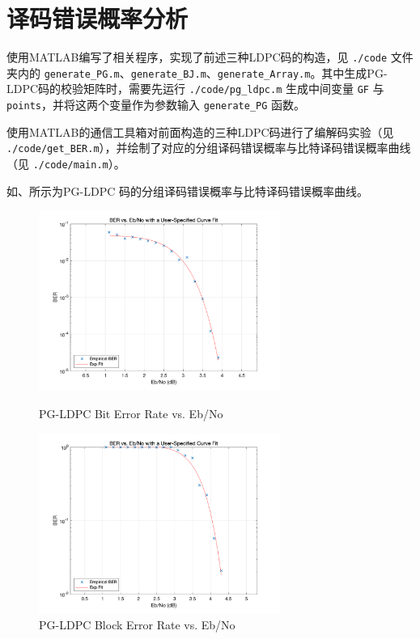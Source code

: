 \documentclass[lang=cn,11pt,a4paper,numbers]{elegantpaper}
\begin{document}
\section{译码错误概率分析}

使用MATLAB编写了相关程序，实现了前述三种LDPC码的构造，见 \lstinline{./code} 文件夹内的 \lstinline{generate_PG.m}、\lstinline{generate_BJ.m}、\lstinline{generate_Array.m}。其中生成PG-LDPC码的校验矩阵时，需要先运行 \lstinline{./code/pg_ldpc.m} 生成中间变量 \lstinline{GF} 与 \lstinline{points}，并将这两个变量作为参数输入 \lstinline{generate_PG} 函数。

使用MATLAB的通信工具箱对前面构造的三种LDPC码进行了编解码实验（见 \lstinline{./code/get_BER.m}），并绘制了对应的分组译码错误概率与比特译码错误概率曲线（见 \lstinline{./code/main.m}）。

如、所示为PG-LDPC 码的分组译码错误概率与比特译码错误概率曲线。

\begin{figure}[htbp]
\begin{minipage}[t]{0.5\linewidth}
\centering
\includegraphics[width=3.1in]{figure/pg_bit_er.png}
\caption{PG-LDPC Bit Error Rate vs. Eb/No}
\label{fig:pg_bit_er}
\end{minipage}%
\begin{minipage}[t]{0.5\linewidth}
\centering
\includegraphics[width=3.1in]{figure/pg_block_er.png}
\caption{PG-LDPC Block Error Rate vs. Eb/No}
\label{fig:pg_block_er}
\end{minipage}
\end{figure}
\end{document}
